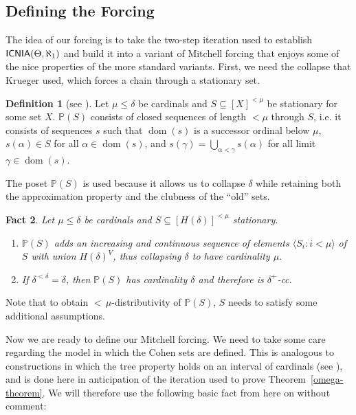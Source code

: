 \documentclass[a4paper]{amsart}
\theoremstyle{definition}
\newtheorem{mydef}{Definition}[section]
\theoremstyle{remark}
\theoremstyle{plain}
\newtheorem{myfact}[mydef]{Fact}
\numberwithin{mydef}{section}
\DeclareMathOperator{\dom}{dom}
\DeclareMathOperator{\ICNIA}{\textup{\textsf{ICNIA}}}
\newcommand{\dP}{\mathbb{P}}
\newcommand{\seq}[2]{\langle #1 : #2 \rangle}
\begin{document}
	\subsection{Defining the Forcing}
	
	The idea of our forcing is to take the two-step iteration used to establish $\ICNIA(\Theta,\aleph_1)$ and build it into a variant of Mitchell forcing that enjoys some of the nice properties of the more standard variants. First, we need the collapse that Krueger used, which forces a chain through a stationary set.
	
	\begin{mydef}[see \cite{Krueger2007}]\label{CollapseClub}
		Let $\mu\leq\delta$ be cardinals and $S\subseteq[X]^{<\mu}$ be stationary for some set $X$. $\dP(S)$ consists of closed sequences of length $<\mu$ through $S$, i.e$.$ it consists of sequences $s$ such that $\dom(s)$ is a successor ordinal below $\mu$, $s(\alpha)\in S$ for all $\alpha\in\dom(s)$, and $s(\gamma)=\bigcup_{\alpha<\gamma}s(\alpha)$ for all limit $\gamma\in\dom(s)$. 
	\end{mydef}
	
The poset $\dP(S)$ is used because it allows us to collapse $\delta$ while retaining both the approximation property and the clubness of the ``old'' sets.
	
	\begin{myfact}
		Let $\mu\leq\delta$ be cardinals and $S\subseteq[H(\delta)]^{<\mu}$ stationary.
		\begin{enumerate}
			\item $\dP(S)$ adds an increasing and continuous sequence of elements $\seq{S_i}{i<\mu}$ of $S$ with union $H(\delta)^V$, thus collapsing $\delta$ to have cardinality $\mu$.
			\item If $\delta^{<\delta}=\delta$, then $\dP(S)$ has cardinality $\delta$ and therefore is $\delta^+$-cc.
		\end{enumerate}
	\end{myfact}
	
	Note that to obtain ${<}\,\mu$-distributivity of $\dP(S)$, $S$ needs to satisfy some additional assumptions.
	
	Now we are ready to define our Mitchell forcing. We need to take some care regarding the model in which the Cohen sets are defined. This is analogous to constructions in which the tree property holds on an interval of cardinals (see \cite{Cummings-Foreman1998}), and is done here in anticipation of the iteration used to prove Theorem~\ref{omega-theorem}. We will therefore use the following basic fact from here on without comment:
	
\end{document}
